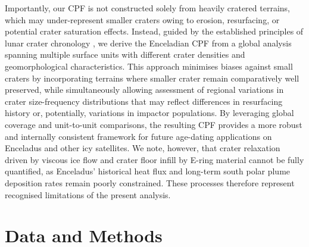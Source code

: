 \documentclass[preprint,11pt,3p,times,authoryear]{elsarticle}
\begin{document}
Importantly, our CPF is not constructed solely from heavily cratered terrains, which may under-represent smaller craters owing to erosion, resurfacing, or potential crater saturation effects. Instead, guided by the established principles of lunar crater chronology \citep{Neukum1983}, we derive the Enceladian CPF from a global analysis spanning multiple surface units with different crater densities and geomorphological characteristics. This approach minimises biases against small craters by incorporating terrains where smaller crater remain comparatively well preserved, while simultaneously allowing assessment of regional variations in crater size-frequency distributions that may reflect differences in resurfacing history or, potentially, variations in impactor populations. By leveraging global coverage and unit-to-unit comparisons, the resulting CPF provides a more robust and internally consistent framework for future age-dating applications on Enceladus and other icy satellites. We note, however, that crater relaxation driven by viscous ice flow and crater floor infill by E-ring material cannot be fully quantified, as Enceladus' historical heat flux and long-term south polar plume deposition rates remain poorly constrained. These processes therefore represent
recognised limitations of the present analysis.\\


\section{Data and Methods}
\label{sec:data}
\end{document}

